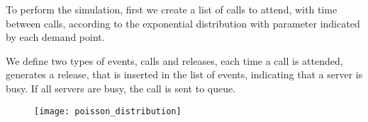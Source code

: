 To perform the simulation,
first we create a list of calls to attend,
with time between calls,
according to the exponential distribution
with parameter indicated by each demand point.

We define two types of events, 
calls and releases, 
each time a call is attended,
generates a release,
that is inserted in the list of events, 
indicating that a server is busy.
If all servers are busy, the call is sent to queue.
\begin{figure}
  \texttt{[image: poisson\_distribution]}
\end{figure}
